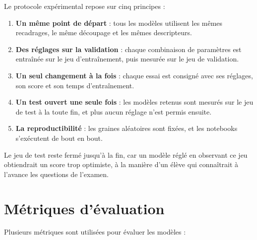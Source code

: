 Le protocole expérimental repose sur cinq principes :

\begin{enumerate}
  \item \textbf{Un même point de départ} : tous les modèles utilisent les mêmes recadrages, le même découpage et les mêmes descripteurs.
  \item \textbf{Des réglages sur la validation} : chaque combinaison de paramètres est entraînée sur le jeu d'entraînement, puis mesurée sur le jeu de validation.
  \item \textbf{Un seul changement à la fois} : chaque essai est consigné avec ses réglages, son score et son temps d'entraînement.
  \item \textbf{Un test ouvert une seule fois} : les modèles retenus sont mesurés sur le jeu de test à la toute fin, et plus aucun réglage n'est permis ensuite.
  \item \textbf{La reproductibilité} : les graines aléatoires sont fixées, et les notebooks s'exécutent de bout en bout.
\end{enumerate}

Le jeu de test reste fermé jusqu'à la fin, car un modèle réglé en observant ce jeu obtiendrait un score trop optimiste, à la manière d'un élève qui connaîtrait à l'avance les questions de l'examen.

\section{Métriques d'évaluation}
\label{sec:metriques}

Plusieurs métriques sont utilisées pour évaluer les modèles :

